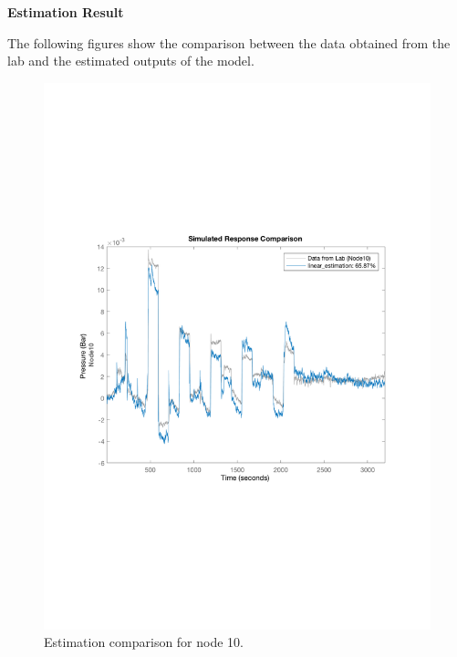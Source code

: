 \textbf{Estimation Result}

The following figures show the comparison between the data obtained from the lab and the estimated outputs of the model.  

\begin{figure}[H]
  \centering
  \begin{minipage}[b]{0.45\textwidth}
    \includegraphics[width=\textwidth]{report/pictures/Node10_estimation_1.pdf}
    \caption{Estimation comparison for node 10.}
  \end{minipage}
  \hfill
  \begin{minipage}[b]{0.45\textwidth}

\end{minipage}
\end{figure}
